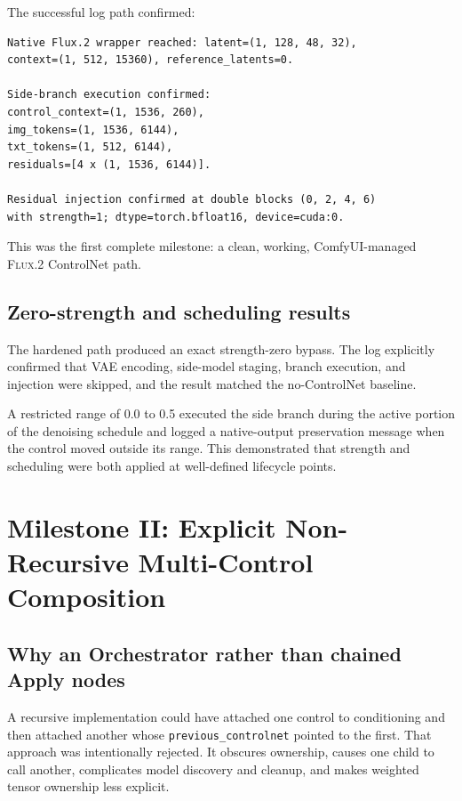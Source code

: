 \documentclass[11pt]{article}
\newcommand{\FluxTwo}{\textsc{Flux.2}}
\newcommand{\code}[1]{\texttt{#1}}
\begin{document}
The successful log path confirmed:

\begin{lstlisting}[style=textstyle,caption={Representative successful single-control diagnostics.}]
Native Flux.2 wrapper reached: latent=(1, 128, 48, 32),
context=(1, 512, 15360), reference_latents=0.

Side-branch execution confirmed:
control_context=(1, 1536, 260),
img_tokens=(1, 1536, 6144),
txt_tokens=(1, 512, 6144),
residuals=[4 x (1, 1536, 6144)].

Residual injection confirmed at double blocks (0, 2, 4, 6)
with strength=1; dtype=torch.bfloat16, device=cuda:0.
\end{lstlisting}

This was the first complete milestone: a clean, working, ComfyUI-managed \FluxTwo{} ControlNet path.

\subsection{Zero-strength and scheduling results}

The hardened path produced an exact strength-zero bypass. The log explicitly confirmed that VAE encoding, side-model staging, branch execution, and injection were skipped, and the result matched the no-ControlNet baseline.

A restricted range of 0.0 to 0.5 executed the side branch during the active portion of the denoising schedule and logged a native-output preservation message when the control moved outside its range. This demonstrated that strength and scheduling were both applied at well-defined lifecycle points.

\section{Milestone II: Explicit Non-Recursive Multi-Control Composition}

\subsection{Why an Orchestrator rather than chained Apply nodes}

A recursive implementation could have attached one control to conditioning and then attached another whose \code{previous\_controlnet} pointed to the first. That approach was intentionally rejected. It obscures ownership, causes one child to call another, complicates model discovery and cleanup, and makes weighted tensor ownership less explicit.
\end{document}
